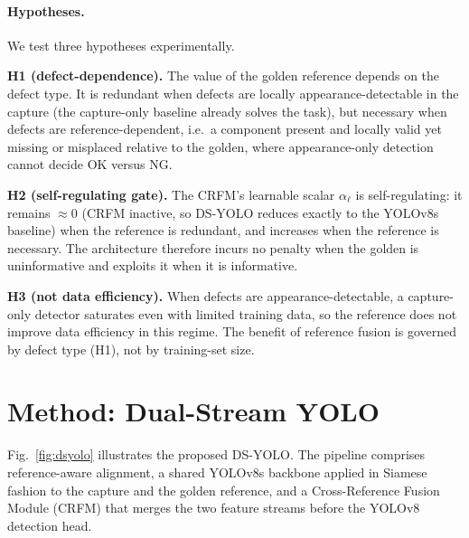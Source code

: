 \documentclass[conference]{IEEEtran}
\begin{document}
\paragraph*{Hypotheses.}
We test three hypotheses experimentally.

\noindent\textbf{H1 (defect-dependence).} The value of the golden reference
depends on the defect type. It is redundant when defects are locally
appearance-detectable in the capture (the capture-only baseline already solves
the task), but necessary when defects are reference-dependent, i.e.\ a component
present and locally valid yet missing or misplaced relative to the golden, where
appearance-only detection cannot decide OK versus NG.

\noindent\textbf{H2 (self-regulating gate).} The CRFM's learnable scalar
$\alpha_\ell$ is self-regulating: it remains $\approx\!0$ (CRFM inactive, so
DS-YOLO reduces exactly to the YOLOv8s baseline) when the reference is redundant,
and increases when the reference is necessary. The architecture therefore incurs
no penalty when the golden is uninformative and exploits it when it is
informative.

\noindent\textbf{H3 (not data efficiency).} When defects are appearance-detectable,
a capture-only detector saturates even with limited training data, so the
reference does not improve data efficiency in this regime. The benefit of reference
fusion is governed by defect type (H1), not by training-set size.

\section{Method: Dual-Stream YOLO}
\label{sec:method}

Fig.~\ref{fig:dsyolo} illustrates the proposed DS-YOLO. The pipeline comprises
reference-aware alignment, a shared YOLOv8s backbone applied in Siamese fashion to
the capture and the golden reference, and a Cross-Reference Fusion Module (CRFM)
that merges the two feature streams before the YOLOv8 detection head.
\end{document}
